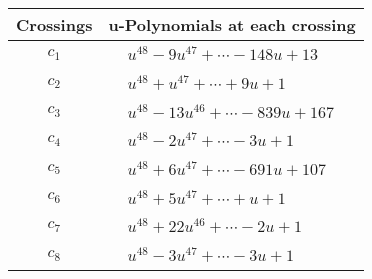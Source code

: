 \documentclass[1p]{elsarticle_modified}
\theoremstyle{definition}
\begin{document}
\begin{tabular}{m{50pt}|m{274pt}}
Crossings & \hspace{64pt}u-Polynomials at each crossing \\
\hline $$\begin{aligned}c_{1}\end{aligned}$$&$\begin{aligned}
&u^{48}-9 u^{47}+\cdots-148 u+13
\end{aligned}$\\
\hline $$\begin{aligned}c_{2}\end{aligned}$$&$\begin{aligned}
&u^{48}+u^{47}+\cdots+9 u+1
\end{aligned}$\\
\hline $$\begin{aligned}c_{3}\end{aligned}$$&$\begin{aligned}
&u^{48}-13 u^{46}+\cdots-839 u+167
\end{aligned}$\\
\hline $$\begin{aligned}c_{4}\end{aligned}$$&$\begin{aligned}
&u^{48}-2 u^{47}+\cdots-3 u+1
\end{aligned}$\\
\hline $$\begin{aligned}c_{5}\end{aligned}$$&$\begin{aligned}
&u^{48}+6 u^{47}+\cdots-691 u+107
\end{aligned}$\\
\hline $$\begin{aligned}c_{6}\end{aligned}$$&$\begin{aligned}
&u^{48}+5 u^{47}+\cdots+u+1
\end{aligned}$\\
\hline $$\begin{aligned}c_{7}\end{aligned}$$&$\begin{aligned}
&u^{48}+22 u^{46}+\cdots-2 u+1
\end{aligned}$\\
\hline $$\begin{aligned}c_{8}\end{aligned}$$&$\begin{aligned}
&u^{48}-3 u^{47}+\cdots-3 u+1
\end{aligned}$\\

\end{tabular}
\end{document}
